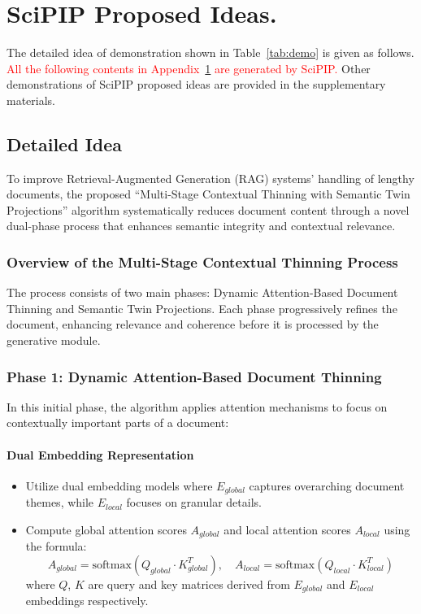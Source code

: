 \documentclass{article}
\theoremstyle{plain}
\theoremstyle{definition}
\theoremstyle{remark}
\begin{document}
\section{SciPIP Proposed Ideas.} \label{sec:spi}

The detailed idea of demonstration shown in Table~\ref{tab:demo} is given as follows. \textcolor{red}{All the following contents in Appendix~\ref{sec:spi} are generated by SciPIP.} Other demonstrations of SciPIP proposed ideas are provided in the supplementary materials.

\subsection{Detailed Idea}

To improve Retrieval-Augmented Generation (RAG) systems' handling of lengthy documents, the proposed ``Multi-Stage Contextual Thinning with Semantic Twin Projections'' algorithm systematically reduces document content through a novel dual-phase process that enhances semantic integrity and contextual relevance.

\subsubsection{Overview of the Multi-Stage Contextual Thinning Process}

The process consists of two main phases: Dynamic Attention-Based Document Thinning and Semantic Twin Projections. Each phase progressively refines the document, enhancing relevance and coherence before it is processed by the generative module.

\subsubsection{Phase 1: Dynamic Attention-Based Document Thinning} 

In this initial phase, the algorithm applies attention mechanisms to focus on contextually important parts of a document:

\paragraph{Dual Embedding Representation}
\begin{itemize}
    \item Utilize dual embedding models where $E_{global}$ captures overarching document themes, while $E_{local}$ focuses on granular details.
    \item Compute global attention scores $A_{global}$ and local attention scores $A_{local}$ using the formula:
$$
A_{global} = \text{softmax}(Q_{global} \cdot K_{global}^T), \quad A_{local} = \text{softmax}(Q_{local} \cdot K_{local}^T)
$$
where $Q$, $K$ are query and key matrices derived from $E_{global}$ and $E_{local}$ embeddings respectively.
\end{itemize}
\end{document}
